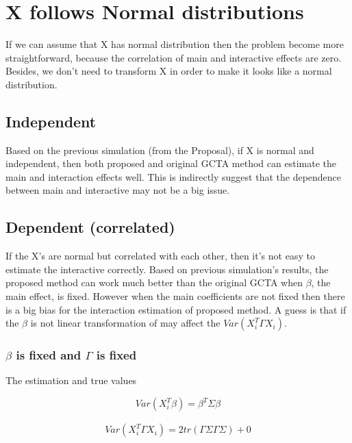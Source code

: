 \documentclass[]{article}
\begin{document}
\newpage

\section{X follows Normal
distributions}\label{x-follows-normal-distributions}

If we can assume that X has normal distribution then the problem become
more straightforward, because the correlation of main and interactive
effects are zero. Besides, we don't need to transform X in order to make
it looks like a normal distribution.

\subsection{Independent}\label{independent}

Based on the previous simulation (from the Proposal), if X is normal and
independent, then both proposed and original GCTA method can estimate
the main and interaction effects well. This is indirectly suggest that
the dependence between main and interactive may not be a big issue.

\subsection{Dependent (correlated)}\label{dependent-correlated}

If the X's are normal but correlated with each other, then it's not easy
to estimate the interactive correctly. Based on previous simulation's
results, the proposed method can work much better than the original GCTA
when \(\beta\), the main effect, is fixed. However when the main
coefficients are not fixed then there is a big bias for the interaction
estimation of proposed method. A guess is that if the \(\beta\) is not
linear transformation of may affect the \(Var(X_i^T\Gamma X_i)\).

\newpage

\subsubsection{\texorpdfstring{\(\beta\) is fixed and \(\Gamma\) is
fixed}{\textbackslash{}beta is fixed and \textbackslash{}Gamma is fixed}}\label{beta-is-fixed-and-gamma-is-fixed}

The estimation and true values

\[
    Var(X_i^T\beta) = \beta^T \Sigma \beta
\]

\begin{align*}
    Var(X_i^T\Gamma X_i) = 2tr(\Gamma \Sigma \Gamma \Sigma) + 0
\end{align*}
\end{document}
